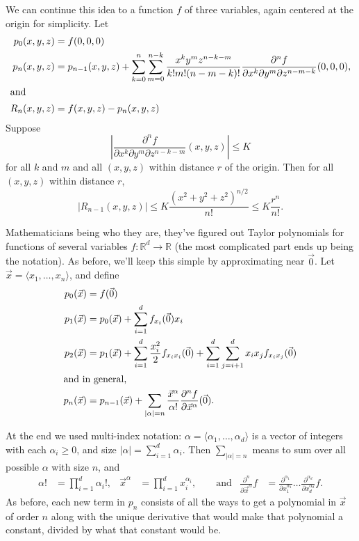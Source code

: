 \documentclass{amsart}
\newcommand{\BBR}{\mathbb{R}}
\newcommand{\abs}[1]{\left\lvert#1\right\rvert}
\newcommand{\Ovec}{\vec0}
\newcommand{\xvec}{\vec x}
\begin{document}

We can continue this idea to a function $f$ of three variables, again centered at the origin for simplicity.  Let
\begin{align*}
 p_0(x,y,z) &= f(0,0,0) \\
 p_n(x,y,z) &= p_{n-1}(x,y,z) + \sum_{k=0}^n\sum_{m=0}^{n-k}
 \frac{x^k y^m z^{n-k-m}}{k!m!(n-m-k)!}
 \frac{\partial^n f}{\partial x^k\partial y^m\partial z^{n-m-k}}(0,0,0),\\
 \intertext{and}
 R_n(x,y,z) &= f(x,y,z)-p_n(x,y,z)
\end{align*}
Suppose
\[\abs{\frac{\partial^n f}{\partial x^k\partial y^m\partial z^{n-k-m}}(x,y,z)}\le K\]
for all $k$ and $m$ and all $(x,y,z)$ within distance $r$ of the origin. Then for all $(x,y,z)$ within distance $r$,
\[
 \abs{R_{n-1}(x,y,z)}
 \le K\frac{(x^2+y^2+z^2)^{n/2}}{n!}
 \le K\frac{r^n}{n!}.
\]


Mathematicians being who they are, they've figured out Taylor polynomials for functions of several variables $f:\BBR^d\to\BBR$ (the most complicated part ends up being the notation). As before, we'll keep this simple by approximating near $\Ovec$. Let $\xvec=\langle x_1,\dotsc,x_n\rangle$, and define
\begin{align*}
 p_0(\xvec) & = f(\Ovec) \\
 p_1(\xvec) & = p_0(\xvec)+\sum_{i=1}^d f_{x_i}(\Ovec)x_i \\
 p_2(\xvec) & = p_1(\xvec)+\sum_{i=1}^d \frac{x_i^2}2f_{x_ix_i}(\Ovec)
 +\sum_{i=1}^d\sum_{j=i+1}^d x_ix_j f_{x_ix_j}(\Ovec) \\
 \intertext{and in general,}
 p_n(\xvec) & = p_{n-1}(\xvec) +
 \sum_{\abs\alpha=n}\frac{\xvec^\alpha}{\alpha!}
 \frac{\partial^n f}{\partial\xvec^\alpha}
 (\Ovec).
\end{align*}

At the end we used multi-index notation: $\alpha=\langle\alpha_1,\dotsc,\alpha_d\rangle$ is a vector of integers with each $\alpha_i\ge 0$, and size $\abs\alpha=\sum_{i=1}^d\alpha_i$. Then $\sum_{\abs\alpha=n}$ means to sum over all possible $\alpha$ with size $n$, and
\begin{align*}
 \alpha! & = \prod_{i=1}^d \alpha_i!,
 & \xvec^\alpha & = \prod_{i=1}^d x_i^{\alpha_i}, \qquad\text{and} &
 \frac{\partial^n}{\partial\xvec^\alpha}f
 & = \frac{\partial^{\alpha_1}}{\partial x_1^{\alpha_1}}
 \dotso\frac{\partial^{\alpha_d}}{\partial x_d^{\alpha_d}}f.
\end{align*}
As before, each new term in $p_n$ consists of all the ways to get a polynomial in $\xvec$ of order $n$ along with the unique derivative that would make that polynomial a constant, divided by what that constant would be.
\end{document}
